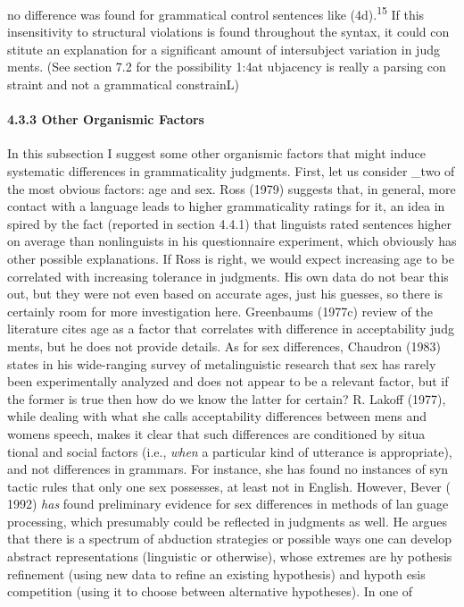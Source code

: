 \begin{styleTextbody}
no difference was found for grammatical control sentences like (4d).\textsuperscript{15}\textsuperscript{ }If this insensitivity to structural violations is found throughout the syntax, it could con\- stitute an explanation for a significant amount of intersubject variation in judg\- ments. (See section 7.2 for the possibility 1:4at ubjacency is really a parsing con\- straint and not a grammatical constrainL)
\end{styleTextbody}


\paragraph[4.3.3 Other Organismic Factors]{4.3.3 Other Organismic Factors}
\begin{styleTextbody}
In this subsection I suggest some other organismic factors that might induce systematic differences in grammaticality judgments. First, let us consider \_two of the most obvious factors: age and sex. Ross (1979) suggests that, in general, more contact with a language leads to higher grammaticality ratings for it, an idea in\- spired by the fact (reported in section 4.4.1) that linguists rated sentences higher on average than nonlinguists in his questionnaire experiment, which obviously has other possible explanations. If Ross is right, we would expect increasing age to be correlated with increasing tolerance in judgments. His own data do not bear this out, but they were not even based on accurate ages, just his guesses, so there is certainly room for more investigation here. Greenbaum{\textquotesingle}s (1977c) review of the literature cites age as a factor that correlates with difference in acceptability judg\- ments, but he does not provide details. As for sex differences, Chaudron (1983) states in his wide-ranging survey of metalinguistic research that sex has rarely been experimentally analyzed and {\textquotedbl}does not appear to be a relevant factor,{\textquotedbl} but if the former is true then how do we know the latter for certain? R. Lakoff (1977), while dealing with what she calls acceptability differences between men{\textquotesingle}s and women{\textquotesingle}s speech, makes it clear that such differences are conditioned by situa\- tional and social factors (i.e., \textit{when}\textit{ }a particular kind of utterance is appropriate), and not differences in grammars. For instance, she has found no instances of syn\- tactic rules that only one sex possesses, at least not in English. However, Bever ( 1992) \textit{has}\textit{ }found preliminary evidence for sex differences in methods of lan\- guage processing, which presumably could be reflected in judgments as well. He argues that there is a spectrum of {\textquotedbl}abduction strategies{\textquotedbl} or possible ways one can develop abstract representations (linguistic or otherwise), whose extremes are hy\- pothesis refinement (using new data to refine an existing hypothesis) and hypoth\- esis competition (using it to choose between alternative hypotheses). In one of
\end{styleTextbody}


